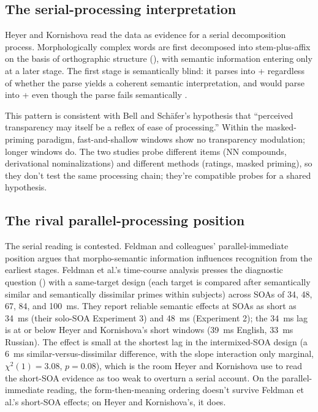 \subsection{The serial-processing interpretation}

Heyer and Kornishova read the data as evidence for a serial decomposition process. Morphologically complex words are first decomposed into stem-plus-affix on the basis of orthographic structure (), with semantic information entering only at a later stage. The first stage is semantically blind: it parses  into  +  regardless of whether the parse yields a coherent semantic interpretation, and would parse  into  +  even though the parse fails semantically \autocite[1112]{heyer-kornishova-2018-priming-eventually}.

This pattern is consistent with Bell and Schäfer's \autocite*{bell-schafer-2016-modelling-transparency} hypothesis that \enquote{perceived transparency may itself be a reflex of ease of processing.} Within the masked-priming paradigm, fast-and-shallow windows show no transparency modulation; longer windows do. The two studies probe different items (NN compounds, derivational nominalizations) and different methods (ratings, masked priming), so they don't test the same processing chain; they're compatible probes for a shared hypothesis.

\subsection{The rival parallel-processing position}

The serial reading is contested. Feldman and colleagues' parallel-immediate position argues that morpho-semantic information influences recognition from the earliest stages. Feldman et al.'s \autocite*{feldman-etal-2015-must-analysis} time-course analysis presses the diagnostic question () with a same-target design (each target is compared after semantically similar and semantically dissimilar primes within subjects) across SOAs of 34, 48, 67, 84, and 100~ms. They report reliable semantic effects at SOAs as short as 34~ms (their solo-SOA Experiment 3) and 48~ms (Experiment 2); the 34~ms lag is at or below Heyer and Kornishova's short windows (39~ms English, 33~ms Russian). The effect is small at the shortest lag in the intermixed-SOA design (a 6~ms similar-versus-dissimilar difference, with the slope interaction only marginal, $\chi^2(1) = 3.08$, $p = 0.08$), which is the room Heyer and Kornishova use to read the short-SOA evidence as too weak to overturn a serial account. On the parallel-immediate reading, the form-then-meaning ordering doesn't survive Feldman et al.'s short-SOA effects; on Heyer and Kornishova's, it does.

